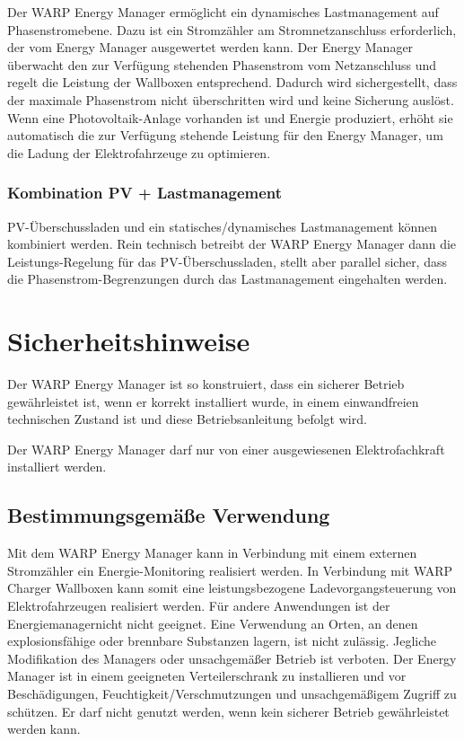 \documentclass[a4paper,10pt]{article}
\newcommand{\hint}[1]{\begin{tcolorbox}[colback=boxgray,colframe=black,coltext=
white,title=Hinweis,left*=2mm,right*=2mm,boxsep=1mm,bottom=1mm,top=1mm]#1\end{tcolorbox}}
\begin{document}
\begin{multicols*}{2}
	Der WARP Energy Manager ermöglicht ein dynamisches Lastmanagement auf Phasenstromebene.
	Dazu ist ein Stromzähler am Stromnetzanschluss erforderlich, der vom Energy Manager
	ausgewertet werden kann. Der Energy Manager überwacht den zur Verfügung stehenden
	Phasenstrom vom Netzanschluss und regelt die Leistung der Wallboxen entsprechend.
	Dadurch wird sichergestellt, dass der maximale Phasenstrom nicht überschritten wird
	und keine Sicherung auslöst. Wenn eine Photovoltaik-Anlage vorhanden ist und Energie
	produziert, erhöht sie automatisch die zur Verfügung stehende Leistung für den
	Energy Manager, um die Ladung der Elektrofahrzeuge zu optimieren.

	\subsubsection{Kombination PV + Lastmanagement}
	PV-Überschussladen und ein statisches/dynamisches Lastmanagement können
	kombiniert werden. Rein technisch betreibt der WARP Energy Manager dann die
	Leistungs-Regelung für das PV-Überschussladen, stellt aber parallel sicher, dass die
	Phasenstrom-Begrenzungen durch das Lastmanagement eingehalten werden.

	\newpage
	\section{Sicherheitshinweise}
	Der WARP Energy Manager ist so konstruiert, dass ein sicherer Betrieb gewährleistet ist,
	wenn er korrekt installiert wurde, in einem einwandfreien technischen Zustand
	ist und diese Betriebsanleitung befolgt wird. \hint{Der WARP Energy Manager darf nur von einer ausgewiesenen Elektrofachkraft installiert
		werden.}

	\subsection{Bestimmungsgemäße Verwendung}
	Mit dem WARP Energy Manager kann in Verbindung mit einem externen
	Stromzähler ein Energie-Monitoring realisiert werden. In Verbindung mit WARP
	Charger Wallboxen kann somit eine leistungsbezogene Ladevorgangsteuerung von
	Elektrofahrzeugen realisiert werden. Für andere Anwendungen ist der
	Energiemanagernicht nicht geeignet. Eine Verwendung
	an Orten, an denen explosionsfähige oder brennbare Substanzen lagern, ist nicht
	zulässig. Jegliche Modifikation des Managers oder unsachgemäßer Betrieb ist verboten. 
	Der Energy Manager ist in einem geeigneten Verteilerschrank zu installieren
	und vor Beschädigungen, Feuchtigkeit/Verschmutzungen und unsachgemäßigem
	Zugriff zu 	schützen. Er darf nicht genutzt werden, wenn kein sicherer Betrieb
	gewährleistet werden kann.


\end{multicols*}
\end{document}
